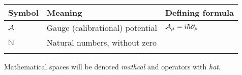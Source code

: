 

\begin{tabular} {@{}C{1.9cm}@{}p{8cm}@{}C{3.77cm}}
	\toprule
	\textbf{Symbol}& \textbf{Meaning}& \textbf{Defining formula}\\\bottomrule
	$\mathcal{A}$ & Gauge (calibrational) potential & $\mathcal{A}_\mu=i\hbar \partial_\mu$ \\
	$\mathbb{N}$ & Natural numbers, without zero \\
\bottomrule
{}
\end{tabular}

Mathematical spaces will be denoted \emph{mathcal} and operators with \emph{hat}.